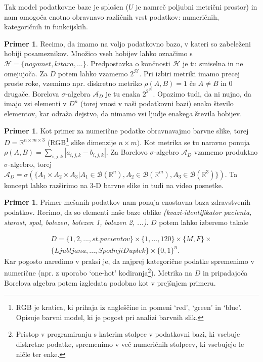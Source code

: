 \documentclass[12pt,a4paper]{amsart}
\theoremstyle{definition} %
\newtheorem{primer}[definicija]{Primer}
\theoremstyle{plain} %
\begin{document}
\newline
\newline
Tak model podatkovne baze je splošen ($U$ je namreč poljubni metrični prostor) in nam omogoča enotno obravnavo različnih vrst podatkov: numeričnih, kategoričnih in funkcijskih.
\begin{primer}  
Recimo, da imamo na voljo podatkovno bazo, v kateri so zabeleženi hobiji posameznikov. Množico vseh hobijev lahko označimo s $\mathcal{H}=\{nogomet, kitara,...\}$. Predpostavka o končnosti $\mathcal{H}$ je tu smiselna in ne omejujoča. Za $D$ potem lahko vzamemo $2^\mathcal{H}$. Pri izbiri metriki imamo precej proste roke, vzemimo npr. diskretno metriko  $\rho(A,B)=1$ če $A \neq B$ in 0 drugače. Borelova $\sigma$-algebra $\mathcal{A}_{D}$ je tu enaka $2^{2^{\mathcal{H}}}$. Opazimo tudi, da ni nujno, da imajo vsi elementi v $D^n$ (torej vnosi v naši podatkovni bazi) enako število elementov, kar odraža dejstvo, da nimamo vsi ljudje enakega števila hobijev.
\end{primer}

\begin{primer} Kot primer za numerične podatke obravnavajmo barvne slike, torej $D = \mathbb{R}^{n\times m \times 3}$ (RGB\footnote{RGB je kratica, ki prihaja iz angleščine in pomeni `red', `green' in `blue'. Opisuje barvni model, ki je pogost pri analizi barvnih slik.}  slike dimenzije $n \times m)$. Kot metrika se tu naravno ponuja $\rho(A,B)=\sum_{i,j,k}  |a_{i,j,k}-b_{i,j,k}|$. Za Borelovo $\sigma$-algebro $\mathcal{A}_{D}$  vzamemo produktno $\sigma$-algebro, torej  $\mathcal{A}_{D}=\sigma(\{A_{1} \times A_{2} \times A_{3} | A_{1} \in \mathcal{B}(\mathbb{R}^n),  A_{2} \in \mathcal{B}(\mathbb{R}^m),  A_{3} \in \mathcal{B}(\mathbb{R}^3) \})$. Ta koncept lahko razširimo na 3-D barvne slike in tudi na video posnetke.
\end{primer}

\begin{primer} Primer mešanih podatkov nam ponuja enostavna baza zdravstvenih podatkov. Recimo, da so elementi naše baze oblike \textit{(kvazi-identifikator pacienta, starost, spol, bolezen, bolezen 1, bolezen 2, ...)}. $D$ potem lahko izberemo takole 

\begin{gather*}
D=\{1,2,...,st. pacientov\} \times \{1,...,120\} \times \{M,F\} \times \\
\{Ljubljana, ... , Spodnji Duplek\} \times \{0,1\}^n.
\end{gather*}
Kar pogosto naredimo v praksi je, da najprej kategorične podatke spremenimo v numerične (npr. z uporabo `one-hot' kodiranja\footnote{Pristop v programiranju s katerim stolpec v podatkovni bazi, ki vsebuje diskretne podatke, spremenimo v več numeričnih stolpcev, ki vsebujejo le ničle ter enke.}). Metrika na $D$ in pripadajoča Borelova algebra potem izgledata podobno kot v prejšnjem primeru.
\end{primer}
\end{document}
